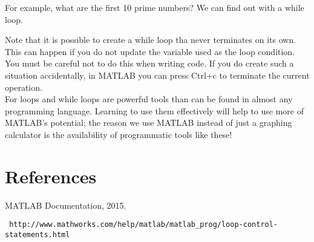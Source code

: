 \documentclass[paper=a4, fontsize=11pt]{scrartcl} %
\numberwithin{equation}{section} %
\numberwithin{figure}{section} %
\numberwithin{table}{section} %
\begin{document}
For example, what are the first 10 prime numbers? We can find out with a while loop. 



Note that it is possible to create a while loop tha never terminates on its own. 
This can happen if you do not update the variable used as the loop condition.
You must be careful not to do this when writing code. 
If you do create such a situation accidentally, in MATLAB you can press Ctrl+c to terminate the current operation.\\

For loops and while loops are powerful tools than can be found in almost any programming language. 
Learning to use them effectively will help to use more of MATLAB's potential; the reason we use MATLAB instead of just a graphing calculator is the availability of programmatic tools like these!
\newpage
\section*{References}
MATLAB Documentation, 2015.

\begin{verbatim} http://www.mathworks.com/help/matlab/matlab_prog/loop-control-statements.html
\end{verbatim}
\end{document}
